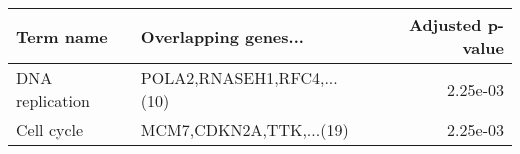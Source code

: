\begin{tabular}{llr}
\toprule
      Term name &       Overlapping genes... &  Adjusted p-value \\
\midrule
DNA replication & POLA2,RNASEH1,RFC4,...(10) &          2.25e-03 \\
     Cell cycle &    MCM7,CDKN2A,TTK,...(19) &          2.25e-03 \\
\bottomrule
\end{tabular}
